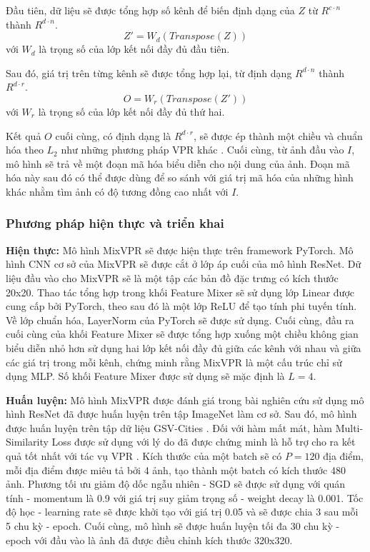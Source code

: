 Đầu tiên, dữ liệu sẽ được tổng hợp số kênh để biến định dạng của $Z$ từ $R^{c \cdot n}$ thành $R^{d \cdot n}$.
$$
  Z' = W_d(Transpose(Z))
$$
với $W_d$ là trọng số của lớp kết nối đầy đủ đầu tiên.

Sau đó, giá trị trên từng kênh sẽ được tổng hợp lại, từ định dạng $R^{d \cdot n}$ thành $R^{d \cdot r}$.
$$
  O = W_r(Transpose(Z'))
$$
với $W_r$ là trọng số của lớp kết nối đầy đủ thứ hai.

Kết quả $O$ cuối cùng, có định dạng là $R^{d \cdot r}$, sẽ được ép thành một chiều và chuẩn hóa theo $L_2$ như những phương pháp VPR khác \cite{arandjelovic2016netvlad,berton2022rethinking}. Cuối cùng, từ ảnh đầu vào $I$, mô hình sẽ trả về một đoạn mã hóa biểu diễn cho nội dung của ảnh. Đoạn mã hóa này sau đó có thể được dùng để so sánh với giá trị mã hóa của những hình khác nhằm tìm ảnh có độ tương đồng cao nhất với $I$.

\subsubsection{Phương pháp hiện thực và triển khai}

\textbf{Hiện thực:} Mô hình MixVPR sẽ được hiện thực trên framework PyTorch. Mô hình CNN cơ sở của MixVPR sẽ được cắt ở lớp áp cuối của mô hình ResNet. Dữ liệu đầu vào cho MixVPR sẽ là một tập các bản đồ đặc trưng có kích thước 20x20. Thao tác tổng hợp trong khối Feature Mixer sẽ sử dụng lớp Linear được cung cấp bởi PyTorch, theo sau đó là một lớp ReLU để tạo tính phi tuyến tính. Về lớp chuẩn hóa, LayerNorm của PyTorch sẽ được sử dụng. Cuối cùng, đầu ra cuối cùng của khối Feature Mixer sẽ được tổng hợp xuống một chiều không gian biểu diễn nhỏ hơn sử dụng hai lớp kết nối đầy đủ giữa các kênh với nhau và giữa các giá trị trong mỗi kênh, chứng minh rằng MixVPR là một cấu trúc chỉ sử dụng MLP. Số khối Feature Mixer được sử dụng sẽ mặc định là $L=4$.

\textbf{Huấn luyện:} Mô hình MixVPR được đánh giá trong bài nghiên cứu sử dụng mô hình ResNet \cite{he2016deep} đã được huấn luyện trên tập ImageNet \cite{krizhevsky2012imagenet} làm cơ sở. Sau đó, mô hình được huấn luyện trên tập dữ liệu GSV-Cities \cite{Ali_bey_2022}. Đối với hàm mất mát, hàm Multi-Similarity Loss \cite{wang2019multi} được sử dụng với lý do đã được chứng minh là hỗ trợ cho ra kết quả tốt nhất với tác vụ VPR \cite{Ali_bey_2022}. Kích thước của một batch sẽ có $P = 120$ địa điểm, mỗi địa điểm được miêu tả bởi 4 ảnh, tạo thành một batch có kích thước 480 ảnh. Phương tối ưu giảm độ dốc ngẫu nhiên - SGD sẽ được sử dụng với quán tính - momentum là 0.9 với giá trị suy giảm trọng số - weight decay là 0.001. Tốc độ học - learning rate sẽ được khởi tạo với giá trị 0.05 và sẽ được chia 3 sau mỗi 5 chu kỳ - epoch. Cuối cùng, mô hình sẽ được huấn luyện tối đa 30 chu kỳ - epoch với đầu vào là ảnh đã được điều chỉnh kích thước 320x320.


